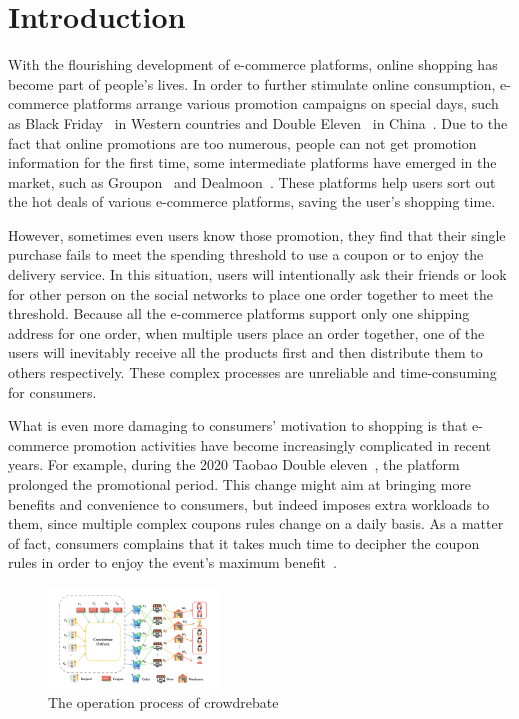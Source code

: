 \section{Introduction}

With the flourishing development of e-commerce platforms, online shopping has become part of people's lives. In order to further stimulate online consumption, e-commerce platforms arrange various promotion campaigns on special days, such as Black Friday~\cite{2013Black} in Western countries and Double Eleven~\cite{double11} in China~\cite{huang2019x}. Due to the fact that online promotions are too numerous, people can not get promotion information for the first time, some intermediate platforms have emerged in the market, such as Groupon~\cite{groupon} and Dealmoon~\cite{dealmoon}. These platforms help users sort out the hot deals of various e-commerce platforms, saving the user's shopping time.

However, sometimes even users know those promotion, they find that their single purchase fails to meet the spending threshold to use a coupon or to enjoy the delivery service. In this situation, users will intentionally ask their friends or look for other person on the social networks to place one order together to meet the threshold. Because all the e-commerce platforms support only one shipping address for one order, when multiple users place an order together, one of the users will inevitably receive all the products first and then distribute them to others respectively. These complex processes are unreliable and time-consuming for consumers.

What is even more damaging to consumers' motivation to shopping is that e-commerce promotion activities have become increasingly complicated in recent years. For example, during the 2020 Taobao Double eleven~\cite{2020}, the platform prolonged the promotional period. This change might aim at bringing more benefits and convenience to consumers, but indeed imposes extra workloads to them, since multiple complex coupons rules change on a daily basis. As a matter of fact, consumers complains that it takes much time to decipher the coupon rules in order to enjoy the event's maximum benefit~\cite{double2020}.
\begin{figure}[t] 
\centering %
		\includegraphics[width=0.4\textwidth]{../figure/crowdrebate process.png} %
	\caption{The operation process of crowdrebate} %
	\label{fig:Crowdrebate} %
	\end{figure}

